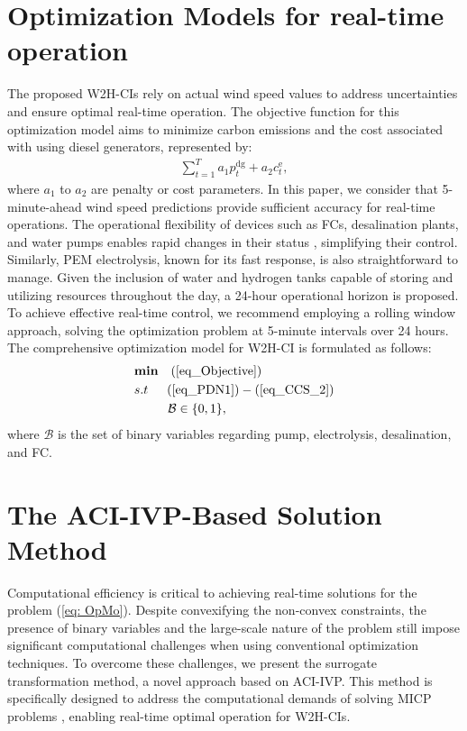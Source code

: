 \documentclass[conference]{IEEEtran}
\begin{document}
\section{Optimization Models for real-time operation}  \label{sec: OpMeth}
The proposed W2H-CIs rely on actual wind speed values to address uncertainties and ensure optimal real-time operation. The objective function for this optimization model aims to minimize carbon emissions and the cost associated with using diesel generators, represented by:
\begin{align} \label{eq_Objective}
\sum_{t=1}^{T} a_1 p^\mathrm{dg}_{t} + a_2 c_t^\textrm{e}, 
\end{align}
where $a_1$ to $a_2$ are penalty \cite{shao2019low} or cost parameters. In this paper, we consider that 5-minute-ahead wind speed predictions provide sufficient accuracy for real-time operations. The operational flexibility of devices such as FCs, desalination plants, and water pumps enables rapid changes in their status \cite{goodarzi2022evaluate}, simplifying their control. Similarly, PEM electrolysis, known for its fast response\cite{daud2017pem}, is also straightforward to manage.
Given the inclusion of water and hydrogen tanks capable of storing and utilizing resources throughout the day, a 24-hour operational horizon is proposed. To achieve effective real-time control, we recommend employing a rolling window approach, solving the optimization problem at 5-minute intervals over 24 hours. The comprehensive optimization model for W2H-CI is formulated as follows:
\begin{align} \label{eq: OpMo}
& \textbf{min} \,\,\,\,\ (\ref{eq_Objective}) \nonumber  \\
& s.t \,\,\,\,\,\,\,\ (\ref{eq_PDN1}) - (\ref{eq_CCS_2}) \nonumber  \\
& \,\,\,\,\,\,\,\,\,\,\,\,\,\,\,\, \mathcal{B} \in \{0,1\},
\end{align}
where $\mathcal{B}$ is the set of binary variables regarding pump, electrolysis, desalination, and FC.


\section{The ACI-IVP-Based Solution Method}  \label{sec: SolMeth}
Computational efficiency is critical to achieving real-time solutions for the problem (\ref{eq: OpMo}). Despite convexifying the non-convex constraints, the presence of binary variables and the large-scale nature of the problem still impose significant computational challenges when using conventional optimization techniques. To overcome these challenges, we present the surrogate transformation method, a novel approach based on ACI-IVP. This method is specifically designed to address the computational demands of solving MICP problems \cite{bertsimas2023prescriptive}, enabling real-time optimal operation for W2H-CIs.
\end{document}
